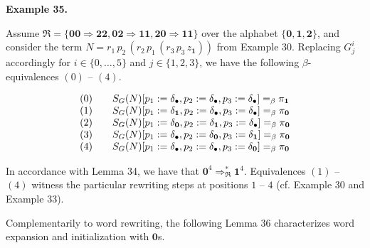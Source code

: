 \documentclass[10pt,a4paper]{amsart}
\begin{document}
 
 
\par\medskip\noindent\textbf{Example 35.}\par
 
 
Assume $\mathfrak{R}=\{\mathbf{0}\mathbf{0}\Rightarrow\mathbf{2}\mathbf{2},\mathbf{0}%
\mathbf{2}\Rightarrow\mathbf{1}\mathbf{1},\mathbf{2}\mathbf{0}\Rightarrow%
\mathbf{1}\mathbf{1}\}$ over the alphabet $\{\mathbf{0},\mathbf{1},\mathbf{2}\}$, and consider the term $N=r_{1}\,p_{2}\,(r_{2}\,p_{1}\,(r_{3}\,p_{3}\,z_{\mathbf{1}}))$ from Example 30. Replacing $G_{j}^{i}$ accordingly for $i\in\{0,\ldots,5\}$ and $j\in\{1,2,3\}$, we have the following $\beta$-equivalences $(0)$ – $(4)$.\par
    \[\begin{array}[]{lll}(0)&&S_{G}(N)[p_{1}:=\delta_{\bullet},p_{2}:=\delta_{%
\bullet},p_{3}:=\delta_{\bullet}]=_{\beta}\pi_{\mathbf{1}}\\
(1)&&S_{G}(N)[p_{1}:=\delta_{\mathbf{1}},p_{2}:=\delta_{\bullet},p_{3}:=\delta%
_{\bullet}]=_{\beta}\pi_{\mathbf{0}}\\
(2)&&S_{G}(N)[p_{1}:=\delta_{\mathbf{0}},p_{2}:=\delta_{\mathbf{1}},p_{3}:=%
\delta_{\bullet}]=_{\beta}\pi_{\mathbf{0}}\\
(3)&&S_{G}(N)[p_{1}:=\delta_{\bullet},p_{2}:=\delta_{\mathbf{0}},p_{3}:=\delta%
_{\mathbf{1}}]=_{\beta}\pi_{\mathbf{0}}\\
(4)&&S_{G}(N)[p_{1}:=\delta_{\bullet},p_{2}:=\delta_{\bullet},p_{3}:=\delta_{%
\mathbf{0}}]=_{\beta}\pi_{\mathbf{0}}\end{array}\]    
  
 
In accordance with Lemma 34, we have that $\mathbf{0}^{4}\Rightarrow_{\mathfrak{R}}^{*}\mathbf{1}^{4}$. Equivalences $(1)$ – $(4)$ witness the particular rewriting steps at positions $1$ – $4$ (cf. Example 30 and Example 33).\par
 
 
 
 
Complementarily to word rewriting, the following Lemma 36 characterizes word expansion and initialization with $\mathbf{0}$s.\par
 
\end{document}
